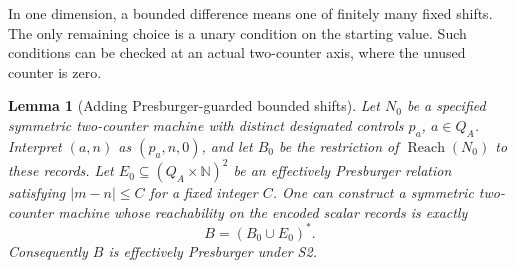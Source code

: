 \documentclass[11pt,a4paper]{article}
\newtheorem{lemma}[theorem]{Lemma}
\theoremstyle{definition}
\theoremstyle{remark}
\newcommand{\N}{\mathbb N}
\newcommand{\Reach}{\operatorname{Reach}}
\begin{document}
In one dimension, a bounded difference means one of finitely many
fixed shifts. The only remaining choice is a unary condition on the
starting value. Such conditions can be checked at an actual two-counter
axis, where the unused counter is zero.

\begin{lemma}[Adding Presburger-guarded bounded shifts]
\label{lem:band-compiler}
Let \(N_0\) be a specified symmetric two-counter machine with distinct
designated controls \(p_a\), \(a\in Q_A\). Interpret
\((a,n)\) as \((p_a,n,0)\), and let \(B_0\) be the restriction of
\(\Reach(N_0)\) to these records.
Let \(E_0\subseteq(Q_A\times\N)^2\) be an effectively Presburger
relation satisfying \(|m-n|\le C\) for a fixed integer \(C\).
One can construct a symmetric two-counter machine whose reachability
on the encoded scalar records is exactly
\[
 B=(B_0\cup E_0)^*.
 \tag{BC}
\]
Consequently \(B\) is effectively Presburger under S2.
\end{lemma}
\end{document}
